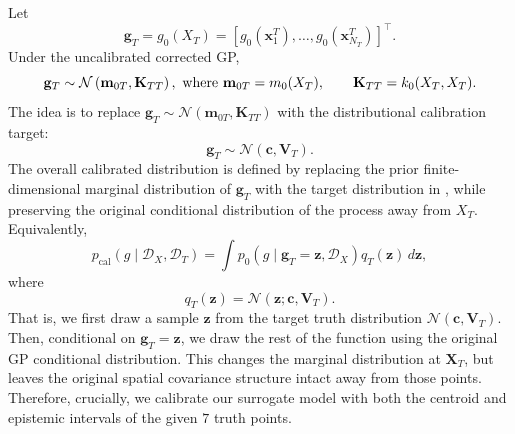 \documentclass[a4paper,12pt]{article}
\newcommand{\mbf}{\mathbf}
\newcommand{\mcl}{\mathcal}
\newcommand{\T}{\textnormal}
\newcommand{\x}{\mathbf{x}}
\begin{document}
Let
\begin{equation*}
    \mathbf{g}_T
    =
    g_0(X_T)
    =
    \left[
    g_0(\x_1^T),\ldots,g_0(\x_{N_T}^T)
    \right]^\top .
\end{equation*}
Under the uncalibrated corrected GP,
\begin{equation*}
    \mathbf{g}_T
    \sim
    \mathcal{N}
    \left(
    \mathbf{m}_{0T},
    \mathbf{K}_{TT}
    \right),~\T{where} ~ \mathbf{m}_{0T}
    =
    m_0(X_T),
    \qquad
    \mathbf{K}_{TT}
    =
    k_0(X_T,X_T).
\end{equation*}
The idea is to replace $\mathbf{g}_T \sim \mathcal{N}
    \left(
    \mathbf{m}_{0T},
    \mathbf{K}_{TT}
    \right)$ with the distributional
    calibration target:
\begin{equation}
    \mathbf{g}_T
    \sim
    \mathcal{N}
    \left(
    \mathbf{c},
    \mathbf{V}_T
    \right).
    \label{eqn:target_truth_marginal}
\end{equation}
The overall calibrated distribution is defined by replacing the prior finite-dimensional
marginal distribution of $\mathbf{g}_T$ with the target distribution in
, while preserving the original conditional
distribution of the process away from $X_T$.  Equivalently,
\begin{equation*}
    p_{\mathrm{cal}}
    \left(
    g \mid \mathcal{D}_X,\mathcal{D}_T
    \right)
    =
    \int
    p_0
    \left(
    g \mid \mathbf{g}_T=\mathbf{z},\mathcal{D}_X
    \right)
    q_T(\mathbf{z})
    \,
    d\mathbf{z},
\end{equation*}
where
\begin{equation*}
    q_T(\mathbf{z})
    =
    \mathcal{N}
    \left(
    \mathbf{z};
    \mathbf{c},
    \mathbf{V}_T
    \right).
\end{equation*}
That is, we first draw a sample $\mbf{z}$ from the target truth distribution $\mcl{N}(\mbf{c}, \mbf{V}_T)$. Then, conditional on $\mathbf{g}_T=\mbf{z}$, we draw the rest of the function using the original GP conditional distribution. This changes the marginal distribution at $\mbf{X}_T$, but leaves the original spatial covariance structure intact away from those points. Therefore, crucially, we calibrate our surrogate model with both the centroid and epistemic intervals of the given $7$ truth points.

\end{document}
